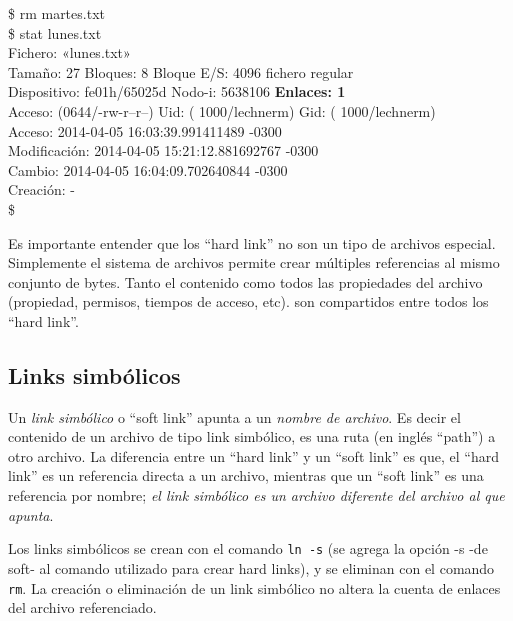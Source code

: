 \documentclass[12pt]{article}
\begin{document}
{{{\$ rm martes.txt  \\
\$ stat lunes.txt  \\
  Fichero: «lunes.txt» \\
  Tamaño: 27        	Bloques: 8          Bloque E/S: 4096   fichero regular \\
Dispositivo: fe01h/65025d	Nodo-i: 5638106     \textbf{Enlaces: 1} \\
Acceso: (0644/-rw-r--r--)  Uid: ( 1000/lechnerm)   Gid: ( 1000/lechnerm) \\
      Acceso: 2014-04-05 16:03:39.991411489 -0300 \\
Modificación: 2014-04-05 15:21:12.881692767 -0300 \\
      Cambio: 2014-04-05 16:04:09.702640844 -0300 \\
    Creación: - \\
\$ 
}
\vspace*{0.4cm} } }

Es importante entender que los ``hard link'' no son un tipo de archivos especial. 
Simplemente el sistema de archivos permite crear múltiples referencias al 
mismo conjunto de bytes. Tanto el contenido como todos las propiedades del archivo
(propiedad, permisos, tiempos de acceso, etc). son compartidos entre todos los 
``hard link''.  

\subsection*{Links simbólicos}
Un \textit{link simbólico} o ``soft link'' apunta a un \textit{nombre de archivo}.
Es decir el contenido de un archivo de tipo link simbólico, es una ruta 
(en inglés ``path'') a otro archivo. La diferencia entre un ``hard link'' y un 
``soft link'' es que, el ``hard link'' es un referencia directa a un archivo, 
mientras que un ``soft link'' es una referencia por nombre; \textit{el link simbólico
es un archivo diferente del archivo al que apunta}.  


Los links simbólicos se crean con el comando \texttt{ln -s} (se agrega la opción -s
-de soft- al comando utilizado para crear hard links), y se eliminan con el comando 
\texttt{rm}. La creación o eliminación de un link simbólico no altera la cuenta de 
enlaces del archivo referenciado. 
\end{document}
